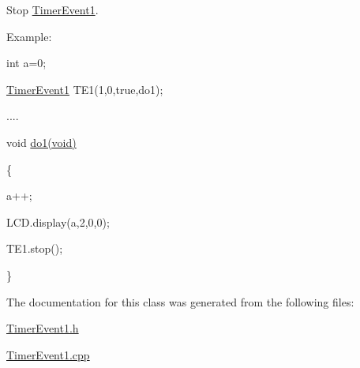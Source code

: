 \label{d8/d74/class_timer_event1_aed7772681d46c2cf3599d87ba4b3bac2}
\par
Stop \hyperlink{class_timer_event1}{TimerEvent1}.\par
 \par
Example:\par
\par
 int a=0; \par
 \hyperlink{class_timer_event1}{TimerEvent1} TE1(1,0,true,do1);\par
 .... \par
 void \hyperlink{main_8cpp_a6f6b769350d62a237ee918e52d844b28}{do1(void)}\par
 \{ \par
 a++; \par
 LCD.display(a,2,0,0);\par
 TE1.stop(); \par
 \}\par
 

The documentation for this class was generated from the following files:\begin{DoxyCompactItemize}
\item 
\hyperlink{_timer_event1_8h}{TimerEvent1.h}\item 
\hyperlink{_timer_event1_8cpp}{TimerEvent1.cpp}\end{DoxyCompactItemize}
